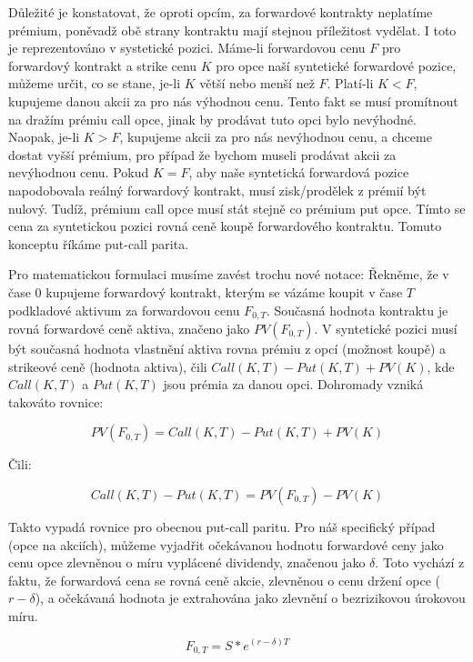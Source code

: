 \documentclass[male,czech,api_bc]{kitheses}
\begin{document}
  Důležité je konstatovat, že oproti opcím, za forwardové kontrakty neplatíme prémium, poněvadž obě strany kontraktu mají stejnou příležitost vydělat. I toto je reprezentováno v systetické pozici. Máme-li forwardovou cenu $F$ pro forwardový kontrakt a strike cenu $K$ pro opce naší syntetické forwardové pozice, můžeme určit, co se stane, je-li $K$ větší nebo menší než $F$. Platí-li $K < F$, kupujeme danou akcii za pro nás výhodnou cenu. Tento fakt se musí promítnout na dražím prémiu call opce, jinak by prodávat tuto opci bylo nevýhodné. Naopak, je-li $K > F$, kupujeme akcii za pro nás nevýhodnou cenu, a chceme dostat vyšší prémium, pro případ že bychom museli prodávat akcii za nevýhodnou cenu. Pokud $K = F$, aby naše syntetická forwardová pozice napodobovala reálný forwardový kontrakt, musí zisk/prodělek z prémií být nulový. Tudíž, prémium call opce musí stát stejně co prémium put opce. Tímto se cena za syntetickou pozici rovná ceně koupě forwardového kontraktu. Tomuto konceptu říkáme put-call parita.

  Pro matematickou formulaci musíme zavést trochu nové notace: Řekněme, že v čase 0 kupujeme forwardový kontrakt, kterým se vázáme koupit v čase $T$ podkladové aktivum za forwardovou cenu $F_{0, T}$. Současná hodnota kontraktu je rovná forwardové ceně aktiva, značeno jako $PV(F_{0, T})$. V syntetické pozici musí být současná hodnota vlastnění aktiva rovna prémiu z opcí (možnost koupě) a strikeové ceně (hodnota aktiva), čili $Call(K, T) - Put(K, T) + PV(K)$, kde $Call(K, T)$ a $Put(K, T)$ jsou prémia za danou opci. Dohromady vzniká takováto rovnice: 

  \begin{equation}
    PV(F_{0, T}) = Call(K, T) - Put(K, T) + PV(K)
  \end{equation}

  Čili:

  \begin{equation}
     Call(K, T) - Put(K, T) = PV(F_{0, T}) - PV(K)
  \end{equation}

  Takto vypadá rovnice pro obecnou put-call paritu. Pro náš specifický případ (opce na akciích), můžeme vyjadřit očekávanou hodnotu forwardové ceny jako cenu opce zlevněnou o míru vyplácené dividendy, značenou jako $\delta$. Toto vychází z faktu, že forwardová cena se rovná ceně akcie, zlevněnou o cenu držení opce ($r - \delta$), a očekávaná hodnota je extrahována jako zlevnění o bezrizikovou úrokovou míru.

  \begin{equation}
    F_{0, T} = S * e^{(r - \delta) T}
  \end{equation}
\end{document}
